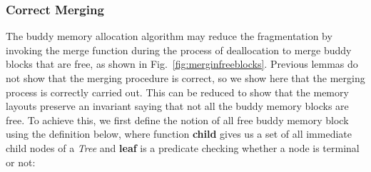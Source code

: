 \subsubsection{Correct Merging}
%
%
%

The buddy memory allocation algorithm may reduce the fragmentation by invoking the merge function during the process of deallocation to merge buddy blocks that are free, as shown in Fig.~\ref{fig:merginfreeblocks}. Previous lemmas do not show that the merging procedure is correct, so we show here that the merging process is correctly carried out. This can be reduced to show that the memory layouts preserve an invariant saying that not all the buddy memory blocks are free. To achieve this, we first define the notion of all free buddy memory block using the definition below, where function \textbf{child} gives us a set of all immediate child nodes of a \emph{Tree} and \textbf{leaf} is a predicate checking whether a node is terminal or not:

